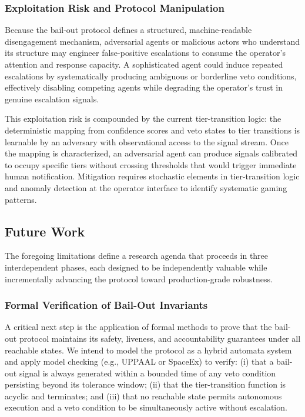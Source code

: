 \subsubsection{Exploitation Risk and Protocol Manipulation}

Because the bail-out protocol defines a structured, machine-readable disengagement
mechanism, adversarial agents or malicious actors who understand its structure may
engineer false-positive escalations to consume the operator's attention and
response capacity.  A sophisticated agent could induce repeated escalations by
systematically producing ambiguous or borderline veto conditions, effectively
disabling competing agents while degrading the operator's trust in genuine
escalation signals.

This exploitation risk is compounded by the current tier-transition logic: the
deterministic mapping from confidence scores and veto states to tier transitions
is learnable by an adversary with observational access to the signal stream.  Once
the mapping is characterized, an adversarial agent can produce signals calibrated
to occupy specific tiers without crossing thresholds that would trigger immediate
human notification.  Mitigation requires stochastic elements in tier-transition
logic and anomaly detection at the operator interface to identify systematic
gaming patterns.

\subsection{Future Work}
\label{sec:future_work}

The foregoing limitations define a research agenda that proceeds in three
interdependent phases, each designed to be independently valuable while
incrementally advancing the protocol toward production-grade robustness.

\subsubsection{Formal Verification of Bail-Out Invariants}

A critical next step is the application of formal methods to prove that the
bail-out protocol maintains its safety, liveness, and accountability guarantees
under all reachable states.  We intend to model the protocol as a hybrid automata
system and apply model checking (e.g., UPPAAL or SpaceEx) to verify: (i) that a
bail-out signal is always generated within a bounded time of any veto condition
persisting beyond its tolerance window; (ii) that the tier-transition function is
acyclic and terminates; and (iii) that no reachable state permits autonomous
execution and a veto condition to be simultaneously active without escalation.

